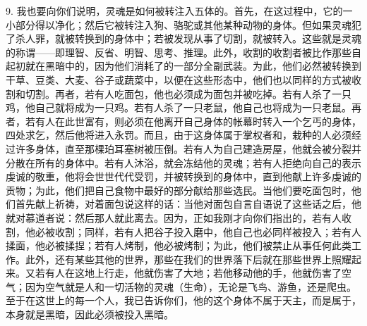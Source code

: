 9. 我也要向你们说明，灵魂是如何被转注入五体的。首先，在这过程中，它的一小部分得以净化；然后它被转注入狗、骆驼或其他某种动物的身体。但如果灵魂犯了杀人罪，就被转换到的身体中；若被发现从事了切割，就被转入。这些就是灵魂的称谓——即理智、反省、明智、思考、推理。此外，收割的收割者被比作那些自起初就在黑暗中的，因为他们消耗了的一部分全副武装。为此，他们必然被转换到干草、豆类、大麦、谷子或蔬菜中，以便在这些形态中，他们也以同样的方式被收割和切割。再者，若有人吃面包，他也必须成为面包并被吃掉。若有人杀了一只鸡，他自己就将成为一只鸡。若有人杀了一只老鼠，他自己也将成为一只老鼠。再者，若有人在此世富有，则必须在他离开自己身体的帐幕时转入一个乞丐的身体，四处求乞，然后他将进入永罚。而且，由于这身体属于掌权者和，栽种的人必须经过许多身体，直至那棵珀耳塞树被压倒。若有人为自己建造房屋，他就会被分裂并分散在所有的身体中。若有人沐浴，就会冻结他的灵魂；若有人拒绝向自己的表示虔诚的敬重，他将会世世代代受罚，并被转换到的身体中，直到他献上许多虔诚的贡物；为此，他们把自己食物中最好的部分献给那些选民。当他们要吃面包时，他们首先献上祈祷，对着面包说这样的话：当他对面包自言自语说了这些话之后，他就对慕道者说：然后那人就此离去。因为，正如我刚才向你们指出的，若有人收割，他必被收割；同样，若有人把谷子投入磨中，他自己也必同样被投入；若有人揉面，他必被揉捏；若有人烤制，他必被烤制；为此，他们被禁止从事任何此类工作。此外，还有某些其他的世界，那些在我们的世界落下后就在那些世界上照耀起来。又若有人在这地上行走，他就伤害了大地；若他移动他的手，他就伤害了空气；因为空气就是人和一切活物的灵魂（生命），无论是飞鸟、游鱼，还是爬虫。至于在这世上的每一个人，我已告诉你们，他的这个身体不属于天主，而是属于，本身就是黑暗，因此必须被投入黑暗。\par


